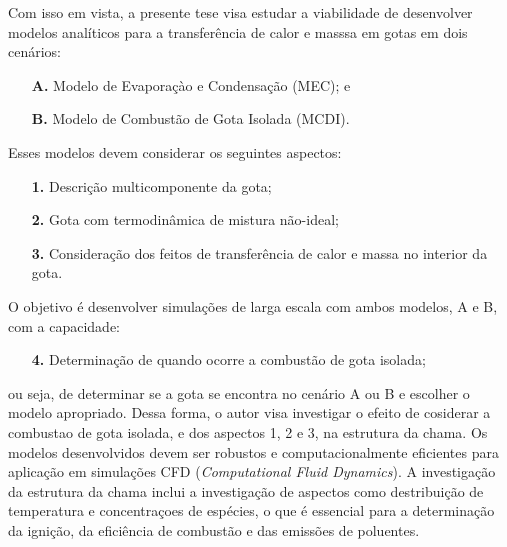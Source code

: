 Com isso em vista, a presente tese visa estudar a viabilidade de desenvolver modelos analíticos para a transferência de calor e masssa em gotas em dois cenários: 
\begin{enumerate}
    \item[\textbf{A.}] Modelo de Evaporaçào e Condensação (MEC); e 
    \item[\textbf{B.}] Modelo de Combustão de Gota Isolada (MCDI).
\end{enumerate}
Esses modelos devem considerar os seguintes aspectos: 
\begin{enumerate}
    \item[\textbf{1.}] Descrição multicomponente da gota; 
    \item[\textbf{2.}] Gota com termodinâmica de mistura não-ideal; 
    \item[\textbf{3.}] Consideração dos feitos de transferência	de calor e massa no interior da gota. 
\end{enumerate}
O objetivo é desenvolver simulações de larga escala com ambos modelos, {A} e {B}, com a capacidade:
\begin{enumerate}
    \item[\textbf{4.}] Determinação de quando ocorre a combustão de gota isolada;
\end{enumerate}
ou seja, de determinar se a gota se encontra no cenário  {A} ou {B} e escolher o modelo apropriado.
Dessa forma, o autor visa investigar o efeito de cosiderar a combustao de gota isolada, e dos aspectos {1}, {2} e {3}, na estrutura da chama.
Os modelos desenvolvidos devem ser robustos e computacionalmente eficientes para aplicação em simulações CFD (\emph{Computational Fluid Dynamics}).
A investigação da estrutura da chama inclui a investigação de aspectos como destribuição de temperatura e concentraçoes de espécies, o que é essencial para a determinação da ignição, da eficiência de combustão e das emissões de poluentes.



